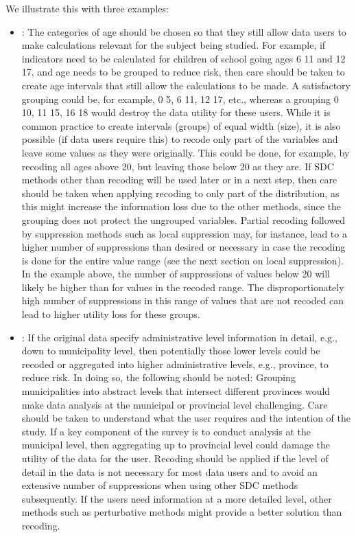 \documentclass[letterpaper,10pt,english]{sphinxmanual}
\begin{document}
We illustrate this with three examples:
\begin{itemize}
\item {} 
: The categories of age should be chosen so that they
still allow data users to make calculations relevant for the subject
being studied. For example, if indicators need to be calculated for
children of school going ages 6 \textendash{} 11 and 12 \textendash{} 17, and age needs to be
grouped to reduce risk, then care should be taken to create age
intervals that still allow the calculations to be made. A
satisfactory grouping could be, for example, 0 \textendash{} 5, 6 \textendash{} 11, 12 \textendash{} 17,
etc., whereas a grouping 0 \textendash{} 10, 11 \textendash{} 15, 16 \textendash{} 18 would destroy the
data utility for these users. While it is common practice to create
intervals (groups) of equal width (size), it is also possible (if
data users require this) to recode only part of the variables and
leave some values as they were originally. This could be done, for
example, by recoding all ages above 20, but leaving those below 20 as
they are. If SDC methods other than recoding will be used later or in
a next step, then care should be taken when applying recoding to only
part of the distribution, as this might increase the information loss
due to the other methods, since the grouping does not protect the
ungrouped variables. Partial recoding followed by suppression methods
such as local suppression may, for instance, lead to a higher number
of suppressions than desired or necessary in case the recoding is
done for the entire value range (see the next section on local
suppression). In the example above, the number of suppressions of
values below 20 will likely be higher than for values in the recoded
range. The disproportionately high number of suppressions in this
range of values that are not recoded can lead to higher utility loss
for these groups.

\item {} 
: If the original data specify administrative
level information in detail, e.g., down to municipality level, then
potentially those lower levels could be recoded or aggregated into
higher administrative levels, e.g., province, to reduce risk. In
doing so, the following should be noted: Grouping municipalities into
abstract levels that intersect different provinces would make data
analysis at the municipal or provincial level challenging. Care
should be taken to understand what the user requires and the
intention of the study. If a key component of the survey is to
conduct analysis at the municipal level, then aggregating up to
provincial level could damage the utility of the data for the user.
Recoding should be applied if the level of detail in the data is not
necessary for most data users and to avoid an extensive number of
suppressions when using other SDC methods subsequently. If the users
need information at a more detailed level, other methods such as
perturbative methods might provide a better solution than recoding.


\end{itemize}
\end{document}
